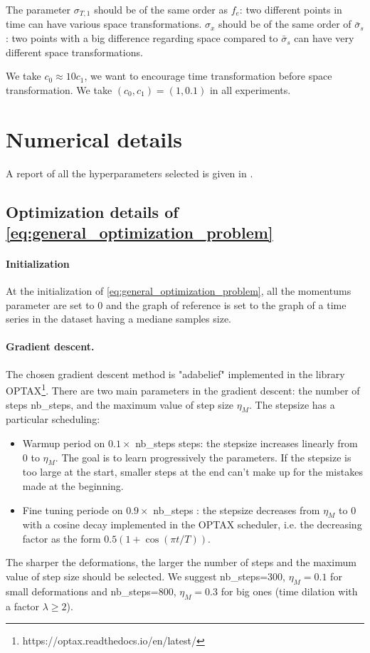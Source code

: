 The parameter $\sigma_{T,1}$ should be of the same order as $f_e$: two different points in time can have various space transformations.
 $\sigma_x$ should be of the same order of $\bar{\sigma}_s$: two points with a big difference regarding space compared to $\bar{\sigma}_s$ can have very different space transformations.

 We take $c_0\approx 10 c_1 $, we want to encourage time transformation before space transformation. We take $(c_0,c_1)=(1,0.1)$ in all experiments.


\section{Numerical details}
A report of all the hyperparameters selected is given in .
\subsection{Optimization details of \eqref{eq:general_optimization_problem}}
\label{appendix:optimizers_details}
\paragraph{Initialization}
At the initialization of \eqref{eq:general_optimization_problem}, all the momentums parameter are set to $0$ and the graph of reference is set to the graph of a time series in the dataset having a mediane samples size.

\paragraph{Gradient descent.}
The chosen gradient descent method is "adabelief" \cite{zhuang2020adabelief} implemented in the library OPTAX\footnote{https://optax.readthedocs.io/en/latest/}.
There are two main parameters in the gradient descent: the number of steps nb\_steps, and the maximum value of step size $\eta_M$.
The stepsize has a particular scheduling: 
\begin{itemize}
  \item Warmup period on $0.1 \times$ nb\_steps steps: the stepsize increases linearly from $0$ to $\eta_M$. The goal is to learn progressively the parameters.
   If the stepsize is too large at the start, smaller steps at the end can't make up for the mistakes made at the beginning. 
  \item Fine tuning periode on $ 0.9  \times$ nb\_steps : the stepsize decreases from $\eta_M$ to $0$ with a cosine decay implemented in the OPTAX scheduler,
   i.e. the decreasing factor as the form $0.5  (1 + \cos(\pi  t/T))$. 
\end{itemize}
The sharper the deformations, the larger the number of steps and the maximum value of step size should be selected.
We suggest nb\_steps=300, $\eta_M=0.1 $ for small deformations and nb\_steps=800, $\eta_M=0.3 $ for big ones (time dilation with a factor $\lambda\geq 2$).


